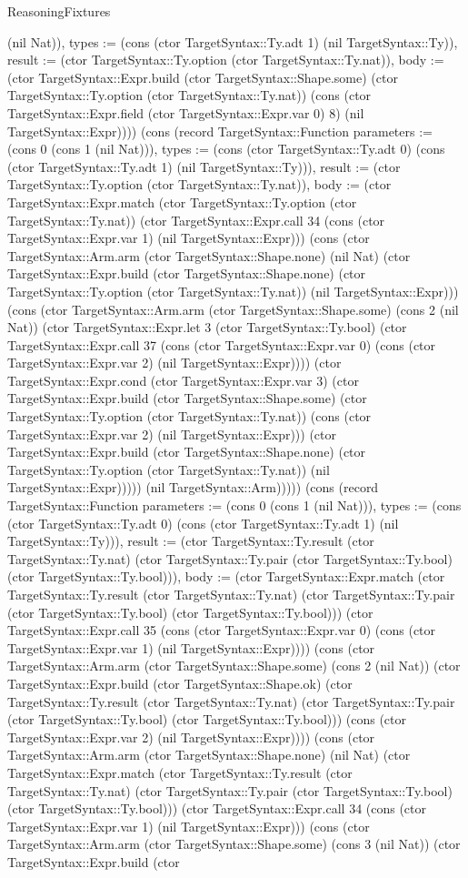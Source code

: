 \begin{lexlean}{ReasoningFixtures}
\begin{semanticmodule}
{(nil Nat)), types := (cons (ctor TargetSyntax::Ty.adt 1) (nil TargetSyntax::Ty)), result := (ctor TargetSyntax::Ty.option (ctor TargetSyntax::Ty.nat)), body := (ctor TargetSyntax::Expr.build (ctor TargetSyntax::Shape.some) (ctor TargetSyntax::Ty.option (ctor TargetSyntax::Ty.nat)) (cons (ctor TargetSyntax::Expr.field (ctor TargetSyntax::Expr.var 0) 8) (nil TargetSyntax::Expr)))}) (cons (record TargetSyntax::Function {parameters := (cons 0 (cons 1 (nil Nat))), types := (cons (ctor TargetSyntax::Ty.adt 0) (cons (ctor TargetSyntax::Ty.adt 1) (nil TargetSyntax::Ty))), result := (ctor TargetSyntax::Ty.option (ctor TargetSyntax::Ty.nat)), body := (ctor TargetSyntax::Expr.match (ctor TargetSyntax::Ty.option (ctor TargetSyntax::Ty.nat)) (ctor TargetSyntax::Expr.call 34 (cons (ctor TargetSyntax::Expr.var 1) (nil TargetSyntax::Expr))) (cons (ctor TargetSyntax::Arm.arm (ctor TargetSyntax::Shape.none) (nil Nat) (ctor TargetSyntax::Expr.build (ctor TargetSyntax::Shape.none) (ctor TargetSyntax::Ty.option (ctor TargetSyntax::Ty.nat)) (nil TargetSyntax::Expr))) (cons (ctor TargetSyntax::Arm.arm (ctor TargetSyntax::Shape.some) (cons 2 (nil Nat)) (ctor TargetSyntax::Expr.let 3 (ctor TargetSyntax::Ty.bool) (ctor TargetSyntax::Expr.call 37 (cons (ctor TargetSyntax::Expr.var 0) (cons (ctor TargetSyntax::Expr.var 2) (nil TargetSyntax::Expr)))) (ctor TargetSyntax::Expr.cond (ctor TargetSyntax::Expr.var 3) (ctor TargetSyntax::Expr.build (ctor TargetSyntax::Shape.some) (ctor TargetSyntax::Ty.option (ctor TargetSyntax::Ty.nat)) (cons (ctor TargetSyntax::Expr.var 2) (nil TargetSyntax::Expr))) (ctor TargetSyntax::Expr.build (ctor TargetSyntax::Shape.none) (ctor TargetSyntax::Ty.option (ctor TargetSyntax::Ty.nat)) (nil TargetSyntax::Expr))))) (nil TargetSyntax::Arm))))}) (cons (record TargetSyntax::Function {parameters := (cons 0 (cons 1 (nil Nat))), types := (cons (ctor TargetSyntax::Ty.adt 0) (cons (ctor TargetSyntax::Ty.adt 1) (nil TargetSyntax::Ty))), result := (ctor TargetSyntax::Ty.result (ctor TargetSyntax::Ty.nat) (ctor TargetSyntax::Ty.pair (ctor TargetSyntax::Ty.bool) (ctor TargetSyntax::Ty.bool))), body := (ctor TargetSyntax::Expr.match (ctor TargetSyntax::Ty.result (ctor TargetSyntax::Ty.nat) (ctor TargetSyntax::Ty.pair (ctor TargetSyntax::Ty.bool) (ctor TargetSyntax::Ty.bool))) (ctor TargetSyntax::Expr.call 35 (cons (ctor TargetSyntax::Expr.var 0) (cons (ctor TargetSyntax::Expr.var 1) (nil TargetSyntax::Expr)))) (cons (ctor TargetSyntax::Arm.arm (ctor TargetSyntax::Shape.some) (cons 2 (nil Nat)) (ctor TargetSyntax::Expr.build (ctor TargetSyntax::Shape.ok) (ctor TargetSyntax::Ty.result (ctor TargetSyntax::Ty.nat) (ctor TargetSyntax::Ty.pair (ctor TargetSyntax::Ty.bool) (ctor TargetSyntax::Ty.bool))) (cons (ctor TargetSyntax::Expr.var 2) (nil TargetSyntax::Expr)))) (cons (ctor TargetSyntax::Arm.arm (ctor TargetSyntax::Shape.none) (nil Nat) (ctor TargetSyntax::Expr.match (ctor TargetSyntax::Ty.result (ctor TargetSyntax::Ty.nat) (ctor TargetSyntax::Ty.pair (ctor TargetSyntax::Ty.bool) (ctor TargetSyntax::Ty.bool))) (ctor TargetSyntax::Expr.call 34 (cons (ctor TargetSyntax::Expr.var 1) (nil TargetSyntax::Expr))) (cons (ctor TargetSyntax::Arm.arm (ctor TargetSyntax::Shape.some) (cons 3 (nil Nat)) (ctor TargetSyntax::Expr.build (ctor }
\end{semanticmodule}
\end{lexlean}
